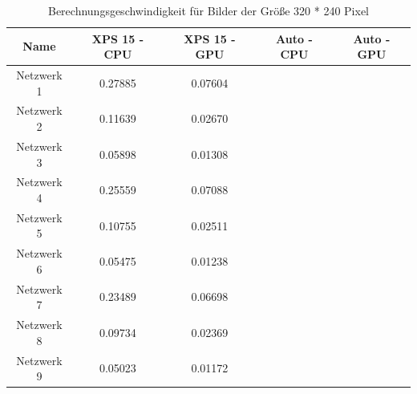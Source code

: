 \begin{table}[H]
    \centering
    \begin{tabular}{ |c|c|c|c|c| }
        \hline
        \textbf{Name} & \textbf{XPS 15 - CPU} & \textbf{XPS 15 - GPU} & \textbf{Auto - CPU} & \textbf{Auto - GPU}   \\ \hline
        Netzwerk 1 & 0.27885 & 0.07604 & & \\ \hline
        Netzwerk 2 & 0.11639 & 0.02670 & & \\ \hline
        Netzwerk 3 & 0.05898 & 0.01308 & & \\ \hline
	
        Netzwerk 4 & 0.25559 & 0.07088 & & \\ \hline
        Netzwerk 5 & 0.10755 & 0.02511 & & \\ \hline
        Netzwerk 6 & 0.05475 & 0.01238 & & \\ \hline

        Netzwerk 7 & 0.23489 & 0.06698 & & \\ \hline
        Netzwerk 8 & 0.09734 & 0.02369 & & \\ \hline
        Netzwerk 9 & 0.05023 & 0.01172 & & \\ \hline
    \end{tabular}
    \caption{Berechnungsgeschwindigkeit für Bilder der Größe 320 * 240 Pixel}
    \label{tab:320x240}
\end{table}
